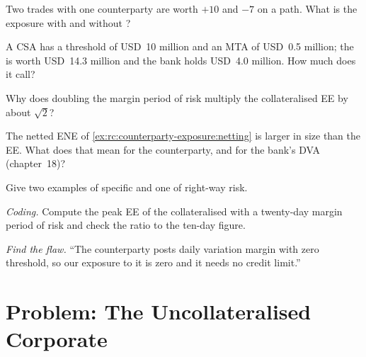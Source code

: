 \begin{exercise}[$\star$]\label{exo:rc:counterparty-exposure:2}
Two trades with one counterparty are worth $+10$ and $-7$ on a path. What is the exposure
with and without ?
\end{exercise}

\begin{exercise}[$\star$]\label{exo:rc:counterparty-exposure:3}
A CSA has a threshold of USD~10 million and an MTA of USD~0.5 million; the  is
worth USD~14.3 million and the bank holds USD~4.0 million. How much does it call?
\end{exercise}

\begin{exercise}[$\star\star$]\label{exo:rc:counterparty-exposure:4}
Why does doubling the margin period of risk multiply the collateralised EE by about
$\sqrt2$?
\end{exercise}

\begin{exercise}[$\star\star$]\label{exo:rc:counterparty-exposure:5}
The netted ENE of \cref{ex:rc:counterparty-exposure:netting} is larger in size than the EE.
What does that mean for the counterparty, and for the bank's DVA (chapter~18)?
\end{exercise}

\begin{exercise}[$\star\star$]\label{exo:rc:counterparty-exposure:6}
Give two examples of specific  and one of right-way risk.
\end{exercise}

\begin{exercise}[$\star\star\star$]\label{exo:rc:counterparty-exposure:7}
\emph{Coding.} Compute the peak EE of the  collateralised with a twenty-day
margin period of risk and check the ratio to the ten-day figure.
\end{exercise}

\begin{exercise}[$\star\star\star$]\label{exo:rc:counterparty-exposure:8}
\emph{Find the flaw.} ``The counterparty posts daily variation margin with zero threshold,
so our exposure to it is zero and it needs no credit limit.''
\end{exercise}

\section{Problem: The Uncollateralised Corporate}

